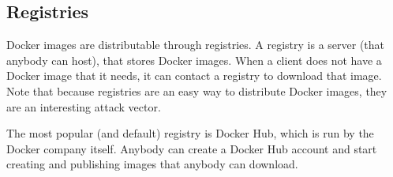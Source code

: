 \subsection{Registries}
Docker images are distributable through registries. A registry is a server (that anybody can host), that stores Docker images. When a client does not have a Docker image that it needs, it can contact a registry to download that image. Note that because registries are an easy way to distribute Docker images, they are an interesting attack vector.

\medskip

The most popular (and default) registry is Docker Hub, which is run by the Docker company itself. Anybody can create a Docker Hub account and start creating and publishing images that anybody can download.
